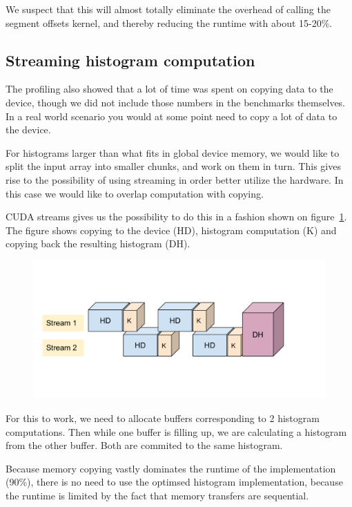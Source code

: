 \documentclass[12pt, a4paper, hidelinks]{article}
\begin{document}
We suspect that this will almost totally eliminate the overhead of calling the segment
offsets kernel, and thereby reducing the runtime with about 15-20\%.

\subsection{Streaming histogram computation}
The profiling also showed that a lot of time was spent on copying data to the device,
though we did not include those numbers in the benchmarks themselves. In a real
world scenario you would at some point need to copy a lot of data to the device.

For histograms larger than what fits in global device memory, we would like to split
the input array into smaller chunks, and work on them in turn.
This gives rise to the possibility of using streaming in order better utilize the hardware.
In this case we would like to overlap computation with copying.

CUDA streams gives us the possibility to do this in a fashion shown on figure~\ref{fig:cuda-stream}.
The figure shows copying to the device (HD),
histogram computation (K) and copying back the resulting histogram (DH).

\begin{figure}[htpb]
    \centering
    \includegraphics[width=0.8\linewidth]{img/cuda-stream.pdf}
    \label{fig:cuda-stream}
\end{figure}

For this to work, we need to allocate buffers corresponding to 2 histogram computations.
Then while one buffer is filling up, we are calculating a histogram from the other
buffer. Both are commited to the same histogram.

Because memory copying vastly dominates the runtime of the implementation (90\%),
there is no need to use the optimsed histogram implementation, because the runtime
is limited by the fact that memory transfers are sequential.
\end{document}
